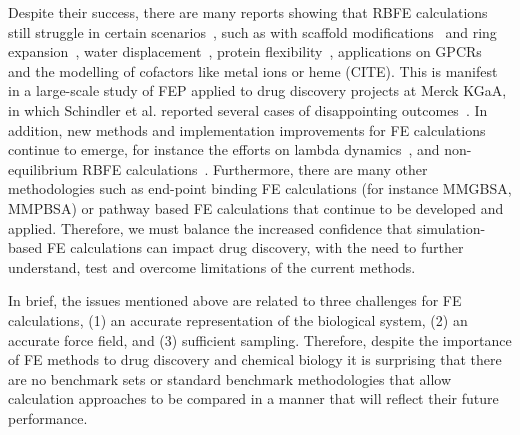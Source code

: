 \documentclass[9pt,bestpractices]{livecoms}
\begin{document}
Despite their success, there are many reports showing that RBFE calculations still struggle in certain scenarios~\cite{sherborne_collaborating_2016}, such as with scaffold modifications~\cite{wangAccurateModelingScaffold2017} and ring expansion~\cite{liuRingBreakingFeasible2015}, water displacement~\cite{michel_energetics_2009,brucemacdonald_ligand_2018,ross_enhancing_2020a,ben-shalom_accounting_2020}, protein flexibility~\cite{huang_insights_2012,fratev_improved_2019,singh_absolute_2020}, applications on GPCRs~\cite{lenselink_predicting_2016,deflorian_accurate_2020} and the modelling of cofactors like metal ions or heme (CITE). This is manifest in a large-scale study of FEP applied to drug discovery projects at Merck KGaA, in which Schindler et al. reported several cases of disappointing outcomes~\cite{schindler_largescale_2020}. In addition, new methods and implementation improvements for FE calculations continue to emerge, for instance the efforts on lambda dynamics~\cite{knightMultisiteDynamicsSimulated2011,vilseckPredictingBindingFree2018}, and non-equilibrium RBFE calculations~\cite{gapsysLargeScaleRelative2020,rufaChemicalAccuracyAlchemical2020}. Furthermore, there are many other methodologies such as end-point binding FE calculations (for instance MMGBSA, MMPBSA) or pathway based FE calculations that continue to be developed and applied. Therefore, we must balance the increased confidence that simulation-based FE calculations can impact drug discovery, with the need to further understand, test and overcome limitations of the current methods.

In brief, the issues mentioned above are related to three challenges for FE calculations,
(1) an accurate representation of the biological system, 
(2) an accurate force field, and 
(3) sufficient sampling. 
Therefore, despite the importance of FE methods to drug discovery and chemical biology it is surprising that there are no benchmark sets or standard benchmark methodologies that allow calculation approaches to be compared in a manner that will reflect their future performance. 
\end{document}
